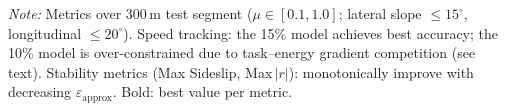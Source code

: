 \documentclass[journal]{IEEEtran}
\begin{document}
	\begin{table}[!t]
		\renewcommand{\arraystretch}{1.2}
		\captionsetup{font=footnotesize, labelfont=footnotesize}
		\caption{Vehicle Control Performance Under Extreme Conditions: Cross-Approximation Comparison}
		\label{tab:trucksim_results_new}
		\centering
		\footnotesize
		\vspace{2mm}
		
		\footnotesize
		\textit{Note:} Metrics over 300\,m test segment ($\mu\in[0.1,1.0]$; lateral slope ${\leq}15^\circ$, longitudinal ${\leq}20^\circ$). Speed tracking: the 15\% model achieves best accuracy; the 10\% model is over-constrained due to task--energy gradient competition (see text). Stability metrics (Max Sideslip, Max\,$|r|$): monotonically improve with decreasing $\varepsilon_{\text{approx}}$. Bold: best value per metric.
	\end{table}
	
\end{document}
